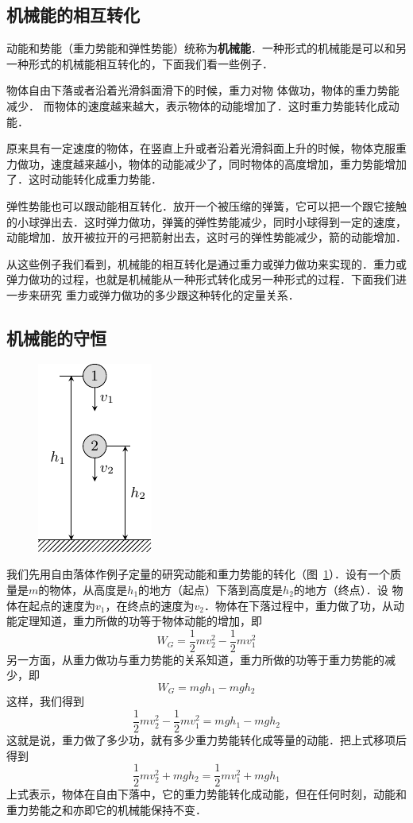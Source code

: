 \subsection{机械能的相互转化}

动能和势能（重力势能和弹性势能）统称为\textbf{机械能}．一种形式的机械能是可以和另一种形式的机械能相互转化的，下面我们看一些例子．

物体自由下落或者沿着光滑斜面滑下的时候，重力对物
体做功，物体的重力势能减少．
而物体的速度越来越大，表示物体的动能增加了．这时重力势能转化成动能．

原来具有一定速度的物体，在竖直上升或者沿着光滑斜面上升的时候，物体克服重力做功，速度越来越小，物体的动能减少了，同时物体的高度增加，重力势能增加了．这时动能转化成重力势能．

弹性势能也可以跟动能相互转化．放开一个被压缩的弹簧，它可以把一个跟它接触的小球弹出去．这时弹力做功，弹簧的弹性势能减少，同时小球得到一定的速度，动能增加．放开被拉开的弓把箭射出去，这时弓的弹性势能减少，箭的动能增加．

从这些例子我们看到，机械能的相互转化是通过重力或弹力做功来实现的．重力或弹力做功的过程，也就是机械能从一种形式转化成另一种形式的过程．下面我们进一步来研究
重力或弹力做功的多少跟这种转化的定量关系．
	
\subsection{机械能的守恒} 
\begin{figure}[htbp]
    \centering
    \includegraphics{fig/A/7-20.pdf}
    \caption{}\label{fig_A_7-20}
\end{figure}

我们先用自由落体作例子定量的研究动能和重力势能的转化（图~\ref{fig_A_7-20}）．设有一个质量是$m$的物体，从高度是$h_1$的地方（起点）下落到高度是$h_2$的地方（终点）．设
物体在起点的速度为$v_1$，在终点的速度为$v_2$．物体在下落过程中，重力做了功，从动能定理知道，重力所做的功等于物体动能的增加，即
\[W_G=\frac{1}{2}mv_2^2-\frac{1}{2}mv^2_1 \]
另一方面，从重力做功与重力势能的关系知道，重力所做的功等于重力势能的减少，即
\[W_G=mgh_1-mgh_2\]
这样，我们得到
\[\frac{1}{2}mv_2^2-\frac{1}{2}mv^2_1 =mgh_1-mgh_2\]
这就是说，重力做了多少功，就有多少重力势能转化成等量的动能．把上式移项后得到
\[ \frac{1}{2}mv^2_2 +mgh_2=\frac{1}{2}mv^2_1 +mgh_1\]
上式表示，物体在自由下落中，它的重力势能转化成动能，但在任何时刻，动能和重力势能之和亦即它的机械能保持不变．

